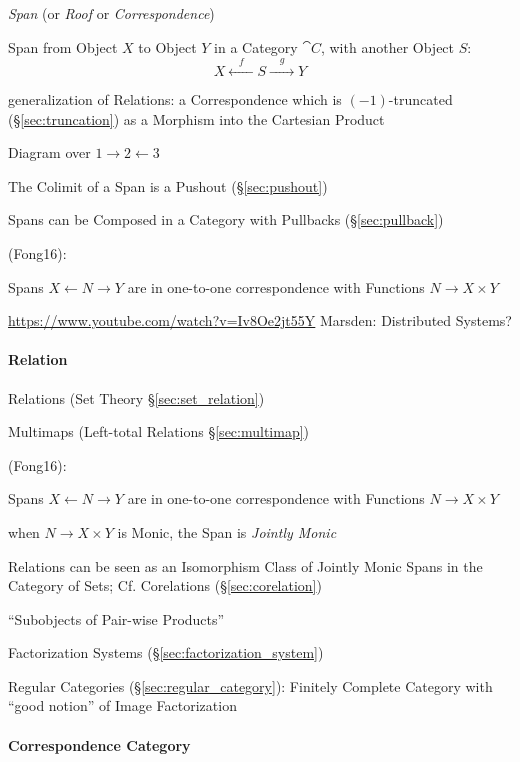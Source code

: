 \emph{Span} (or \emph{Roof} or \emph{Correspondence})

Span from Object $X$ to Object $Y$ in a Category $\cat{C}$, with
another Object $S$:
\[
  X \xleftarrow{\quad f \quad} S \xrightarrow{\quad g \quad} Y
\]

generalization of Relations: a Correspondence which is
$(-1)$-truncated (\S\ref{sec:truncation}) as a Morphism into the
Cartesian Product

Diagram over $1 \rightarrow 2 \leftarrow 3$

The Colimit of a Span is a Pushout (\S\ref{sec:pushout})

Spans can be Composed in a Category with Pullbacks
(\S\ref{sec:pullback})

(Fong16):

Spans $X \leftarrow N \rightarrow Y$ are in one-to-one correspondence
with Functions $N \rightarrow X \times Y$

\url{https://www.youtube.com/watch?v=Iv8Oe2jt55Y} Marsden: Distributed
Systems? %



\paragraph{Relation}\label{sec:relation}\hfill

\fist Relations (Set Theory \S\ref{sec:set_relation})

\fist Multimaps (Left-total Relations \S\ref{sec:multimap})

(Fong16):

Spans $X \leftarrow N \rightarrow Y$ are in one-to-one correspondence
with Functions $N \rightarrow X \times Y$

when $N \rightarrow X \times Y$ is Monic, the Span is \emph{Jointly
  Monic}

Relations can be seen as an Isomorphism Class of Jointly Monic Spans
in the Category of Sets; \fist Cf. Corelations
(\S\ref{sec:corelation})

``Subobjects of Pair-wise Products'' %

Factorization Systems (\S\ref{sec:factorization_system}) %

\fist Regular Categories (\S\ref{sec:regular_category}): Finitely
Complete Category with ``good notion'' of Image Factorization



\paragraph{Correspondence Category}\label{sec:correspondence_category}\hfill

